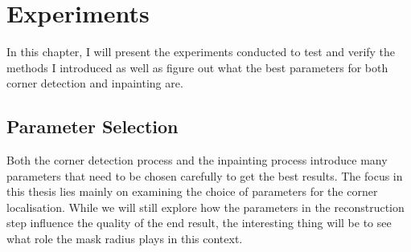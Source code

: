 \newcommand*{\addheight}[2][.5ex]{%
  \raisebox{0pt}[\dimexpr\height+(#1)\relax]{#2}%
}

\chapter{Experiments}\label{ch:Experiments} 
In this chapter, I will present the experiments conducted to test and verify the methods I
introduced as well as figure out what the best parameters for both corner detection and inpainting
are.\\

\section{Parameter Selection}\label{sec:ParameterSelection}

Both the corner detection process and the inpainting process introduce many parameters that need to
be chosen carefully to get the best results. The focus in this thesis lies mainly on examining the
choice of parameters for the corner localisation. While we will still explore how the parameters in
the reconstruction step influence the quality of the end result, the interesting thing will be to
see what role the mask radius plays in this context.


